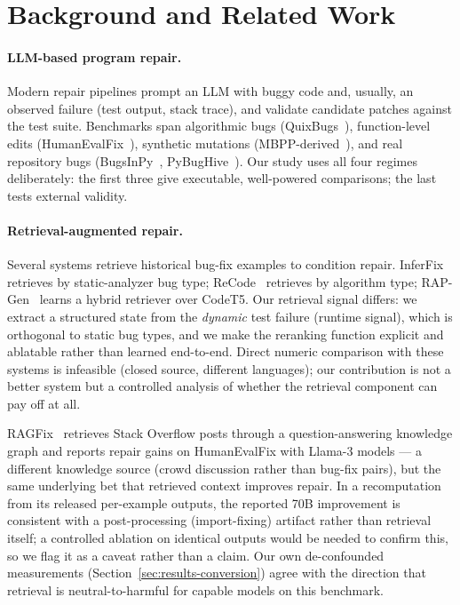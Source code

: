 \section{Background and Related Work}
\label{sec:related}

\paragraph{LLM-based program repair.} Modern repair pipelines prompt an LLM
with buggy code and, usually, an observed failure (test output, stack trace),
and validate candidate patches against the test suite. Benchmarks span
algorithmic bugs (QuixBugs~\cite{quixbugs}), function-level edits
(HumanEvalFix~\cite{octopack}), synthetic mutations
(MBPP-derived~\cite{mbpp}), and real repository bugs
(BugsInPy~\cite{bugsinpy}, PyBugHive~\cite{pybughive}). Our study uses all
four regimes deliberately: the first three give executable, well-powered
comparisons; the last tests external validity.

\paragraph{Retrieval-augmented repair.} Several systems retrieve historical
bug-fix examples to condition repair. InferFix~\cite{inferfix} retrieves by
static-analyzer bug type; ReCode~\cite{recode} retrieves by algorithm type;
RAP-Gen~\cite{rapgen} learns a hybrid retriever over CodeT5. Our retrieval
signal differs: we extract a structured state from the \emph{dynamic} test
failure (runtime signal), which is orthogonal to static bug types, and we make
the reranking function explicit and ablatable rather than learned
end-to-end. Direct numeric comparison with these systems is infeasible
(closed source, different languages); our contribution is not a better
system but a controlled analysis of whether the retrieval component can pay
off at all.

RAGFix~\cite{ragfix} retrieves Stack Overflow posts through a
question-answering knowledge graph and reports repair gains on HumanEvalFix
with Llama-3 models --- a different knowledge source (crowd discussion rather
than bug-fix pairs), but the same underlying bet that retrieved context
improves repair. In a recomputation from its released per-example outputs,
the reported 70B improvement is consistent with a post-processing
(import-fixing) artifact rather than retrieval itself; a controlled ablation
on identical outputs would be needed to confirm this, so we flag it as a
caveat rather than a claim. Our own de-confounded measurements
(Section~\ref{sec:results-conversion}) agree with the direction that
retrieval is neutral-to-harmful for capable models on this benchmark.

